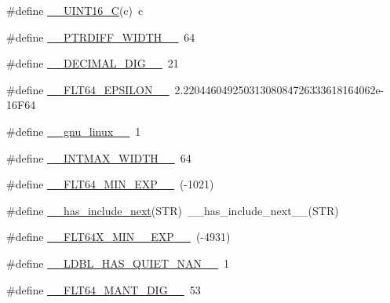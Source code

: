\begin{DoxyCompactItemize}
\item 
\#define \hyperlink{cmake-build-debug_2babel__client__autogen_2moc__predefs_8h_aa860a111dcff819d3502dda14f8ac778}{\+\_\+\+\_\+\+U\+I\+N\+T16\+\_\+C}(c)~c
\item 
\#define \hyperlink{cmake-build-debug_2babel__client__autogen_2moc__predefs_8h_a96b511bfa61e4203ec3668fb39063309}{\+\_\+\+\_\+\+P\+T\+R\+D\+I\+F\+F\+\_\+\+W\+I\+D\+T\+H\+\_\+\+\_\+}~64
\item 
\#define \hyperlink{cmake-build-debug_2babel__client__autogen_2moc__predefs_8h_aeb56455e98000942147dfd63ec1c2fa6}{\+\_\+\+\_\+\+D\+E\+C\+I\+M\+A\+L\+\_\+\+D\+I\+G\+\_\+\+\_\+}~21
\item 
\#define \hyperlink{cmake-build-debug_2babel__client__autogen_2moc__predefs_8h_ad293ff29c0ac9a6b4187d366d6de3772}{\+\_\+\+\_\+\+F\+L\+T64\+\_\+\+E\+P\+S\+I\+L\+O\+N\+\_\+\+\_\+}~2.\+22044604925031308084726333618164062e-\/16\+F64
\item 
\#define \hyperlink{cmake-build-debug_2babel__client__autogen_2moc__predefs_8h_a51b087854dc3c2f76946efb432745639}{\+\_\+\+\_\+gnu\+\_\+linux\+\_\+\+\_\+}~1
\item 
\#define \hyperlink{cmake-build-debug_2babel__client__autogen_2moc__predefs_8h_a4e8a5398566f8b2666a8a71b2dbcf3ca}{\+\_\+\+\_\+\+I\+N\+T\+M\+A\+X\+\_\+\+W\+I\+D\+T\+H\+\_\+\+\_\+}~64
\item 
\#define \hyperlink{cmake-build-debug_2babel__client__autogen_2moc__predefs_8h_aceda5e62622b9783846d26610d038f71}{\+\_\+\+\_\+\+F\+L\+T64\+\_\+\+M\+I\+N\+\_\+\+E\+X\+P\+\_\+\+\_\+}~(-\/1021)
\item 
\#define \hyperlink{cmake-build-debug_2babel__client__autogen_2moc__predefs_8h_a370369ba2463363de726ff9394861a2b}{\+\_\+\+\_\+has\+\_\+include\+\_\+next}(S\+TR)~\+\_\+\+\_\+has\+\_\+include\+\_\+next\+\_\+\+\_\+(S\+TR)
\item 
\#define \hyperlink{cmake-build-debug_2babel__client__autogen_2moc__predefs_8h_ad2396317be1036fdc4481d54343487de}{\+\_\+\+\_\+\+F\+L\+T64\+X\+\_\+\+M\+I\+N\+\_\+\_\+\+E\+X\+P\+\_\+\+\_\+}~(-\/4931)
\item 
\#define \hyperlink{cmake-build-debug_2babel__client__autogen_2moc__predefs_8h_a10a15ae17c3b791fe9b9721965ebfee4}{\+\_\+\+\_\+\+L\+D\+B\+L\+\_\+\+H\+A\+S\+\_\+\+Q\+U\+I\+E\+T\+\_\+\+N\+A\+N\+\_\+\+\_\+}~1
\item 
\#define \hyperlink{cmake-build-debug_2babel__client__autogen_2moc__predefs_8h_a6c163c6e58545740cbae55ad8ffa027f}{\+\_\+\+\_\+\+F\+L\+T64\+\_\+\+M\+A\+N\+T\+\_\+\+D\+I\+G\+\_\+\+\_\+}~53

\end{DoxyCompactItemize}

